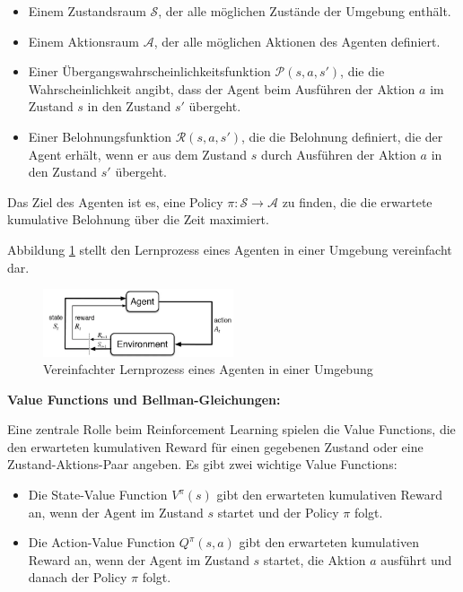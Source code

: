 \documentclass{article}
\theoremstyle{newline}
\begin{document}
\begin{onehalfspace}
\begin{itemize}
	\item Einem Zustandsraum $\mathcal{S}$, der alle möglichen Zustände der Umgebung enthält.
	\item Einem Aktionsraum $\mathcal{A}$, der alle möglichen Aktionen des Agenten definiert.
	\item Einer Übergangswahrscheinlichkeitsfunktion $\mathcal{P}(s, a, s')$, die die Wahrscheinlichkeit angibt, dass der Agent beim Ausführen der Aktion $a$ im Zustand $s$ in den Zustand $s'$ übergeht.
	\item Einer Belohnungsfunktion $\mathcal{R}(s, a, s')$, die die Belohnung definiert, die der Agent erhält, wenn er aus dem Zustand $s$ durch Ausführen der Aktion $a$ in den Zustand $s'$ übergeht.
\end{itemize}

Das Ziel des Agenten ist es, eine Policy $\pi: \mathcal{S} \rightarrow \mathcal{A}$ zu finden, die die erwartete kumulative Belohnung über die Zeit maximiert.

Abbildung \ref{fig:rl_grundlagen} stellt den Lernprozess eines Agenten in einer Umgebung vereinfacht dar.

\begin{figure}[h]
	\centering
	\includegraphics[width=0.5\textwidth]{Bilder/rl_grundlagen.png}
	\caption{Vereinfachter Lernprozess eines Agenten in einer Umgebung\protect\footnotemark}
	\label{fig:rl_grundlagen}
\end{figure}


\textbf{Value Functions und Bellman-Gleichungen:}
\smallskip

Eine zentrale Rolle beim Reinforcement Learning spielen die Value Functions, die den erwarteten kumulativen Reward für einen gegebenen Zustand oder eine Zustand-Aktions-Paar angeben. Es gibt zwei wichtige Value Functions:

\begin{itemize}
	\item Die State-Value Function $V^\pi(s)$ gibt den erwarteten kumulativen Reward an, wenn der Agent im Zustand $s$ startet und der Policy $\pi$ folgt.
	\item Die Action-Value Function $Q^\pi(s, a)$ gibt den erwarteten kumulativen Reward an, wenn der Agent im Zustand $s$ startet, die Aktion $a$ ausführt und danach der Policy $\pi$ folgt.
\end{itemize}


\end{onehalfspace}
\end{document}
